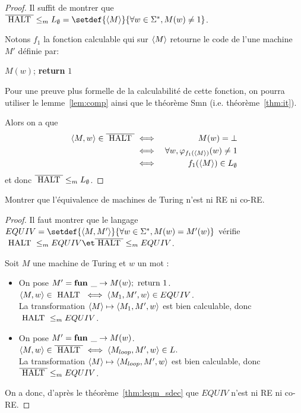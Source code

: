 \begin{proof}
	Il suffit de montrer que $\overline{\halt} \leqm L_{\emptyset} = \setdef{\encode M} {\forall w \in \mots, M(w) \neq 1}$.

	Notons $f_1$ la fonction calculable qui sur $\left\langle M\right\rangle$ retourne le code de l'une machine $M'$ définie par:
	\begin{algorithmic}[lines]
		\State $M(w)$;
		\State \textbf{return} $1$
		\EndFunction
	\end{algorithmic}
	Pour une preuve plus formelle de la calculabilité de cette fonction, on pourra utiliser le lemme~\ref{lem:comp}
	ainsi que le théorème Smn (i.e. théorème~\ref{thm:it}).

	Alors on a que
	\begin{eqnarray*}
		\left\langle M,w\right\rangle \in \overline{\text{ HALT }} &\iff& M(w) = \bot \\
		&\iff& \forall w, \varphi_{f_1(\left\langle M\right\rangle)}(w) \neq 1 \\
		&\iff& f_1(\left\langle M\right\rangle) \in L_{\emptyset}
	\end{eqnarray*} et donc $\overline{\text{ HALT }} \leq_m L_{\emptyset}$.

\end{proof}


\begin{exercice}
	Montrer que l'équivalence de machines de Turing n'est ni RE ni co-RE.
\end{exercice}

\begin{proof}
	Il faut montrer que le langage $EQUIV =  \setdef {\encode {M,M'}} {\forall w \in \mots, M(w) = M'(w)}$ vérifie
	$\halt \leqm EQUIV \et \overline{\halt} \leqm EQUIV$.

	Soit $M$ une machine de Turing et $w$ un mot :
	\begin{itemize}
		\item On pose $M' =  \textbf{fun } \_ \rightarrow M(w); \text{ return } 1$. \\
		      $\left\langle M,w\right\rangle \in \text{ HALT } \iff \left\langle M_1, M', w\right\rangle \in EQUIV$. \\
		      La transformation $\left\langle M\right\rangle \mapsto \left\langle M_1, M', w\right\rangle$ est bien calculable, donc $\text{ HALT } \leq_m EQUIV$.
		\item  On pose $M' =  \textbf{fun } \_ \rightarrow M(w)$. \\
		      $\left\langle M,w\right\rangle \in \overline{\text{ HALT }} \iff \left\langle M_{loop}, M', w\right\rangle \in L$. \\
		      La transformation $\left\langle M\right\rangle \mapsto \left\langle M_{loop}, M', w\right\rangle$ est bien calculable, donc $\overline{\text{ HALT }} \leq_m EQUIV$.
	\end{itemize}

	On a donc, d'après le théorème~\ref{thm:leqm_sdec} que $EQUIV$ n'est ni RE ni co-RE.
\end{proof}


